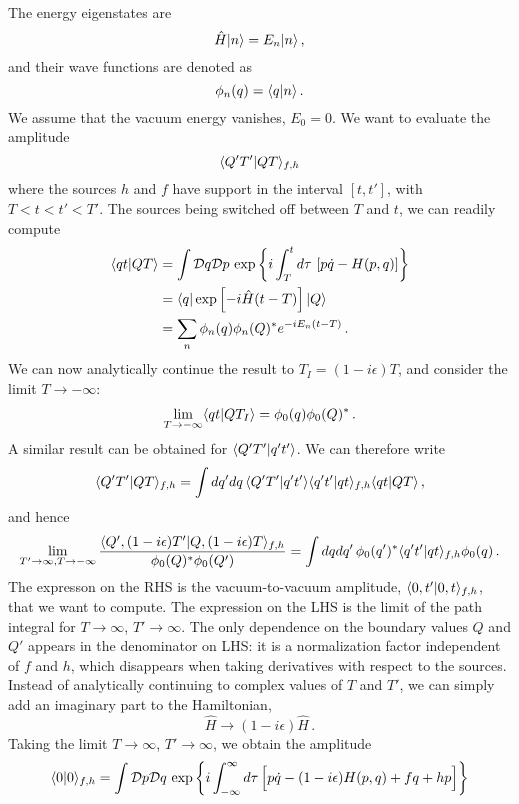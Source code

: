 The energy eigenstates are
\begin{equation}
  \label{eq:EnEigen}
  \hat{H} | n \rangle = E_n | n \rangle\, ,
\end{equation}
and their wave functions are denoted as
\begin{equation}
  \label{eq:EnEigenFun}
  \phi_n(q) = \langle q | n \rangle\, .
\end{equation}
We assume that the vacuum energy vanishes, $E_0=0$. We want to
evaluate the amplitude
\begin{equation}
  \label{eq:LargeQAmpl}
  \langle Q'T' | QT \rangle_{f,h}
\end{equation}
where the sources $h$ and $f$ have support in the interval $[t,t']$,
with $T < t < t' < T'$. The sources being switched off between $T$
and $t$, we can readily compute
\begin{align}
  \langle qt | QT \rangle &= \int \mathcal{D}q \mathcal{D}p \,
                    \exp\left\{
                    i \int_T^t d\tau\, \left[
                    p \dot{q} - H(p,q)
                    \right]
                    \right\} \\
  &= \langle q | \exp\left[-i \hat{H} (t-T)\right] | Q \rangle \\
  &= \sum_n \phi_n(q) \phi_n(Q)^* e^{-i E_n(t-T)}\, .
\end{align}
We can now analytically continue the result to $T_I=(1-i\epsilon)T$,
and consider the limit $T\to -\infty$:
\begin{align}
  \lim_{T\to -\infty} \langle qt | QT_I \rangle = \phi_0(q) \phi_0(Q)^*\, .
\end{align}
A similar result can be obtained for $\langle Q'T' | q't' \rangle$. We can
therefore write
\begin{align}
  \langle Q'T' | QT \rangle_{f,h} = \int dq' dq\, \langle Q'T' | q't' \rangle \langle q't' | qt \rangle_{f,h}
  \langle qt | QT \rangle\, ,
\end{align}
and hence
\begin{align}
 \lim_{T'\to\infty,T\to -\infty} 
\frac{\langle Q', (1-i\epsilon)T' | Q, (1-i\epsilon)T \rangle_{f,h}}{\phi_0(Q)^* \phi_0(Q')} = 
  \int dq dq'\, \phi_0(q')^* \langle q't' | qt \rangle_{f,h} \phi_0(q)\, .
\end{align}
The expresson on the RHS is the vacuum-to-vacuum amplitude,
$\langle 0,t' | 0,t \rangle_{f,h}$, that we want to compute. The expression on
the LHS is the limit of the path integral for $T\to\infty$,
$T'\to\infty$. The only dependence on the boundary values $Q$ and $Q'$
appears in the denominator on LHS: it is a normalization factor
independent of $f$ and $h$, which disappears when taking derivatives
with respect to the sources. Instead of analytically continuing to
complex values of $T$ and $T'$, we can simply add an imaginary part to
the Hamiltonian,
\begin{equation}
  \label{eq:ComplexTermHam}
  \hat{H} \to (1-i\epsilon) \hat{H}\, .
\end{equation}
Taking the limit $T\to\infty$, $T'\to\infty$, we obtain the amplitude
\begin{equation}
  \label{eq:VacToVac}
  \langle 0 | 0 \rangle_{f,h} = \int \mathcal{D}p \mathcal{D}q \, \exp
  \left\{
    i \int_{-\infty}^\infty d\tau\, \Big[
      p \dot{q} - (1-i\epsilon) H(p,q) + f q + h p 
      \Big]
  \right\}
\end{equation}


